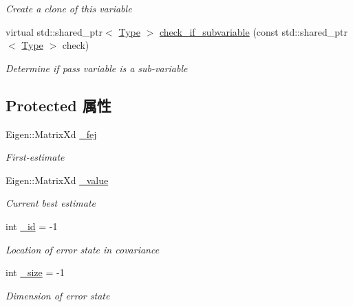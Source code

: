 \begin{DoxyCompactItemize}
\begin{DoxyCompactList}\small\item\em Create a clone of this variable \end{DoxyCompactList}\item 
virtual std\+::shared\+\_\+ptr$<$ \hyperlink{classov__type_1_1Type}{Type} $>$ \hyperlink{classov__type_1_1Type_a95fcdbc584256baffc78935de5ab5da3}{check\+\_\+if\+\_\+subvariable} (const std\+::shared\+\_\+ptr$<$ \hyperlink{classov__type_1_1Type}{Type} $>$ check)
\begin{DoxyCompactList}\small\item\em Determine if pass variable is a sub-\/variable \end{DoxyCompactList}\end{DoxyCompactItemize}
\subsection*{Protected 属性}
\begin{DoxyCompactItemize}
\item 
\mbox{\label{classov__type_1_1Type_a9e035fed9c1dc0e975f7e41c2a95695f}} 
Eigen\+::\+Matrix\+Xd \hyperlink{classov__type_1_1Type_a9e035fed9c1dc0e975f7e41c2a95695f}{\+\_\+fej}
\begin{DoxyCompactList}\small\item\em First-\/estimate \end{DoxyCompactList}\item 
\mbox{\label{classov__type_1_1Type_a40afb4c94c3d11db860b98c186e22312}} 
Eigen\+::\+Matrix\+Xd \hyperlink{classov__type_1_1Type_a40afb4c94c3d11db860b98c186e22312}{\+\_\+value}
\begin{DoxyCompactList}\small\item\em Current best estimate \end{DoxyCompactList}\item 
\mbox{\label{classov__type_1_1Type_adb644d3f30691886f153527a9782a1e0}} 
int \hyperlink{classov__type_1_1Type_adb644d3f30691886f153527a9782a1e0}{\+\_\+id} = -\/1
\begin{DoxyCompactList}\small\item\em Location of error state in covariance \end{DoxyCompactList}\item 
\mbox{\label{classov__type_1_1Type_ae7450adb49403a591013e1719ab1e46e}} 
int \hyperlink{classov__type_1_1Type_ae7450adb49403a591013e1719ab1e46e}{\+\_\+size} = -\/1
\begin{DoxyCompactList}\small\item\em Dimension of error state \end{DoxyCompactList}\end{DoxyCompactItemize}


